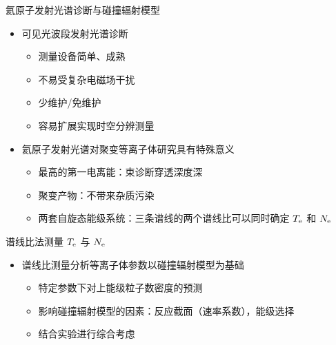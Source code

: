 \begin{CJK*}{UTF8}{kai}
\begin{frame}{氦原子发射光谱诊断与碰撞辐射模型}
	\begin{itemize}
		\item 可见光波段发射光谱诊断
			\begin{itemize}
				\item 测量设备简单、成熟
				\item 不易受复杂电磁场干扰
				\item 少维护/免维护
				\item 容易扩展实现时空分辨测量
			\end{itemize}
		\bigskip
		\item 氦原子发射光谱对聚变等离子体研究具有特殊意义
			\begin{itemize}
				\item 最高的第一电离能：束诊断穿透深度深
				\item 聚变产物：不带来杂质污染
				\item 两套自旋态能级系统：三条谱线的两个谱线比可以同时确定 $T_{\rm e}$ 和 $N_{\rm e}$
			\end{itemize}
	\end{itemize}
\end{frame}

\begin{frame}{谱线比法测量 $T_{\rm e}$ 与 $N_{\rm e}$}
	\begin{center}
		
	\end{center}
	\begin{itemize}
		\item 谱线比测量分析等离子体参数以碰撞辐射模型为基础
			\begin{itemize}
				\item 特定参数下对上能级粒子数密度的预测
				\item 影响碰撞辐射模型的因素：反应截面（速率系数），能级选择
				\item 结合实验进行综合考虑%
			\end{itemize}
	\end{itemize}
\end{frame}


\end{CJK*}

